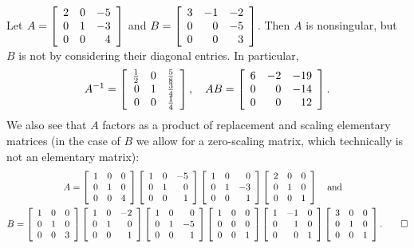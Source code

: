 \begin{Exam} Let $A = \mtx{rrr}{2&0&-5\\0&1&-3\\0&0&4}$ and $B = \mtx{rrr}{3&-1&-2\\0&0&-5\\0&0&3}$. Then $A$ is nonsingular, but $B$ is not by considering their diagonal entries. In particular,
\[A^{-1} = \mtx{rrr}{\frac{1}{2}&0&\frac{5}{8}\\0&1&\frac{3}{4}\\0&0&\frac{1}{4}},\quad AB = \mtx{rrr}{6&-2&-19\\0&0&-14\\0&0&12}.\] We also see that $A$ factors as a product of replacement and scaling elementary matrices (in the case of $B$ we allow for a zero-scaling matrix, which technically is not an elementary matrix):
\begin{multline*} A = \mtx{rrr}{1&0&0\\0&1&0\\0&0&4}\mtx{rrr}{1&0&-5\\0&1&0\\0&0&1}\mtx{rrr}{1&0&0\\0&1&-3\\0&0&1}\mtx{rrr}{2&0&0\\0&1&0\\0&0&1}\quad\text{and}\quad\\ B = \mtx{rrr}{1&0&0\\0&1&0\\0&0&3}\mtx{rrr}{1&0&-2\\0&1&0\\0&0&1}\mtx{rrr}{1&0&0\\0&1&-5\\0&0&1}\mtx{rrr}{1&0&0\\0&0&0\\0&0&1}\mtx{rrr}{1&-1&0\\0&1&0\\0&0&1} \mtx{rrr}{3&0&0\\0&1&0\\0&0&1}.\qedhere\end{multline*}
\end{Exam}\vs

